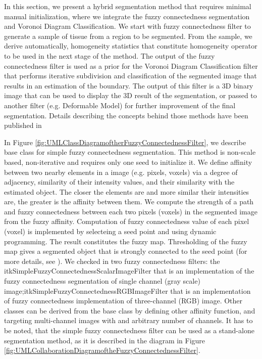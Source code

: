 In this section, we present a hybrid segmentation method that requires minimal
manual initialization, where we integrate the fuzzy connectedness segmentation
and Voronoi Diagram Classification. We start with fuzzy connectedness filter
to generate a sample of tissue from a region to be segmented. From the sample,
we derive automatically, homogeneity statistics that constitute homogeneity
operator to be used in the next stage of the method. The output of the fuzzy 
connectedness filter is used as a prior for the Voronoi Diagram Classification 
filter that performs iterative subdivision and classification of the segmented
image that results in an estimation of the boundary. The output of this filter
is a 3D binary image that can be used to display the 3D result of the
segmentation, or passed to another filter (e.g. Deformable Model) for further
improvement of the final segmentation. Details describing the concepts behind those methods 
have been published in
\cite{Angelini2002,Udupa2002,Jin2002,Imielinska2001,Imielinska2000a,Imielinska2000b}

In Figure \ref{fig:UMLClassDiagramoftherFuzzyConnectednessFilter}, we describe 
base class for simple fuzzy connectedness segmentation. This method is non-scale 
based, non-iterative and requires only one seed to initialize it. We define affinity 
between two nearby elements in a image (e.g. pixels, voxels) via a degree of adjacency, 
similarity of their intensity values, and their similarity with the estimated object. 
The closer the elements are and more similar their intensities are, the greater is 
the affinity between them. We compute the strength of a path and fuzzy connectedness 
between each two pixels (voxels) in the segmented image from the fuzzy affinity. 
Computation of fuzzy connectedness value of each pixel (voxel) is implemented
by selecteing a seed point and using dynamic programming. The result constitutes the fuzzy
map. Thresholding of the fuzzy map gives a segmented object that is strongly connected
to the seed point (for more details, see \cite{Udupa1996}). We checked in two fuzzy 
connectedness filters: the itkSimpleFuzzyConnectednessScalarImageFilter that is an
implementation of the fuzzy connectedness segmentation of single channel (gray scale) 
image;itkSimpleFuzzyConnectednessRGBImageFilter that is an implementation of fuzzy
connectedness implementation of three-channel (RGB) image. Other classes can be derived 
from the base class by defining other affinity function, and targeting multi-channel
images with and arbitrary number of channels. It has to be noted, that the simple fuzzy 
connectedness filter can be used as a stand-alone segmentation method,
as it is described in the diagram in Figure 
\ref{fig:UMLCollaborationDiagramoftheFuzzyConnectednessFilter}.

